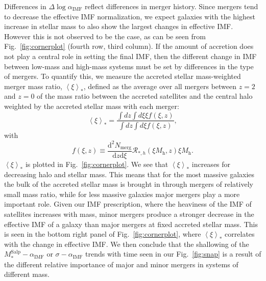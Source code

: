 \documentclass[usenatbib]{mnras}
\def\mhalo{M_{\mathrm{h}}}
\def\msalp{M_*^{\mathrm{Salp}}}
\def\aimf{\alpha_{\mathrm{IMF}}}
\def\Fref#1{Fig.~\ref{#1}\xspace}
\begin{document}
Differences in $\Delta\log{\aimf}$ reflect differences in merger
history.  Since mergers tend to decrease the effective IMF
normalization, we expect galaxies with the highest increase in stellar
mass to also show the largest changes in effective IMF. However this
is not observed to be the case, as can be seen from
\Fref{fig:cornerplot} (fourth row, third column).  If the amount of
accretion does not play a central role in setting the final IMF, then
the different change in IMF between low-mass and high-mass systems
must be set by differences in the type of mergers. To quantify this,
we measure the accreted stellar mass-weighted merger mass ratio,
$\left< \xi \right>_*$, defined as the average over all mergers
between $z=2$ and $z=0$ of the mass ratio between the accreted
satellites and the central halo weighted by the accreted stellar mass
with each merger:
\begin{equation}\label{eq:xieff}
\left< \xi \right>_* = \frac{\int dz \int d\xi \xi f(\xi, z)}{\int dz \int d\xi f(\xi, z)},
\end{equation}
with
\begin{equation}
f(\xi, z) \equiv \frac{\mathrm{d}^2N_{\mathrm{merg}}}{\mathrm{d}z \mathrm{d}\xi} \mathcal{R}_{*,h}(\xi \mhalo, z)\xi\mhalo.
\end{equation}
$\left< \xi \right>_*$ is plotted in \Fref{fig:cornerplot}. We see that $\left< \xi \right>_*$ increases for decreasing halo and stellar mass.
This means that for the most massive galaxies the bulk of the accreted stellar mass is brought in through mergers of relatively small mass ratio, while for less massive galaxies major mergers play a more important role.
Given our IMF prescription, where the heaviness of the IMF of satellites increases with mass, minor mergers produce a stronger decrease in the effective IMF of a galaxy than major mergers at fixed accreted stellar mass. 
This is seen in the bottom right panel of \Fref{fig:cornerplot}, where $\left< \xi \right>_*$ correlates with the change in effective IMF.
We then conclude that the shallowing of the $\msalp-\aimf$ or $\sigma-\aimf$ trends with time seen in our \Fref{fig:snap} is a result of the different relative importance of major and minor mergers in systems of different mass.
\end{document}
